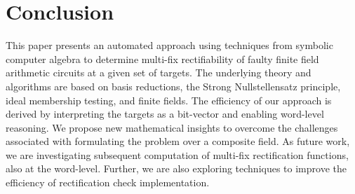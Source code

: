 \section{Conclusion}\label{sec:conc}
This paper presents an automated approach using techniques from 
symbolic computer algebra to determine multi-fix rectifiability of 
faulty finite field arithmetic circuits at a given set of targets. 
The underlying theory and algorithms are based on \Grobner 
basis reductions, the Strong Nullstellensatz principle, ideal membership testing,
and finite fields.
The efficiency of our approach is derived by interpreting the targets 
as a bit-vector and enabling word-level reasoning.
We propose new mathematical insights to overcome the
challenges associated with formulating the problem over a composite field.
As future work, we are
investigating subsequent computation of multi-fix rectification 
functions, also at the word-level. Further, we are also exploring
techniques to improve the efficiency of rectification check implementation.



